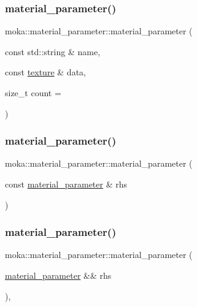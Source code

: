 \subsubsection{\texorpdfstring{material\_parameter()}{material\_parameter()}\hspace{0.1cm}{\footnotesize\ttfamily [8/20]}}
{\footnotesize\ttfamily moka\+::material\+\_\+parameter\+::material\+\_\+parameter (\begin{DoxyParamCaption}\item[{const std\+::string \&}]{name,  }\item[{const \mbox{\hyperlink{namespacemoka_aed2224bc0e5b79e57a8975ded94ee1aaa6d788fcb39cecfd54da7b065a8b75d1a}{texture}} \&}]{data,  }\item[{size\+\_\+t}]{count = {} }\end{DoxyParamCaption})}

\mbox{\label{structmoka_1_1material__parameter_aefdabb59fb40999a1b5ec5d4eadec126}} 
\subsubsection{\texorpdfstring{material\_parameter()}{material\_parameter()}\hspace{0.1cm}{\footnotesize\ttfamily [9/20]}}
{\footnotesize\ttfamily moka\+::material\+\_\+parameter\+::material\+\_\+parameter (\begin{DoxyParamCaption}\item[{const \mbox{\hyperlink{structmoka_1_1material__parameter}{material\+\_\+parameter}} \&}]{rhs }\end{DoxyParamCaption})\hspace{0.3cm}{\ttfamily [default]}}

\mbox{\label{structmoka_1_1material__parameter_a15faed252da4c4f69aaf358ea5b028d2}} 
\subsubsection{\texorpdfstring{material\_parameter()}{material\_parameter()}\hspace{0.1cm}{\footnotesize\ttfamily [10/20]}}
{\footnotesize\ttfamily moka\+::material\+\_\+parameter\+::material\+\_\+parameter (\begin{DoxyParamCaption}\item[{\mbox{\hyperlink{structmoka_1_1material__parameter}{material\+\_\+parameter}} \&\&}]{rhs }\end{DoxyParamCaption})\hspace{0.3cm}{\ttfamily [default]}, {\ttfamily [noexcept]}}

